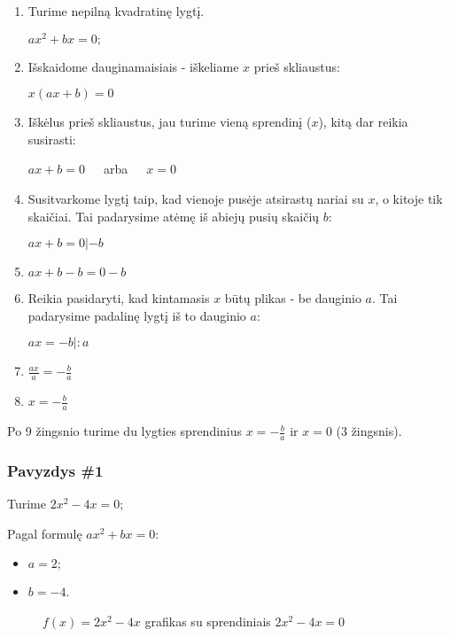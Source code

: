 \documentclass[a4paper]{article}
\begin{document}
\begin{enumerate}
    \item Turime nepilną kvadratinę lygtį.

    $ ax^{2}+ bx = 0; $
    \item Išskaidome dauginamaisiais - iškeliame $ x $ prieš skliaustus:

    $ x(ax + b) = 0 $
    \item Iškėlus prieš skliaustus, jau turime vieną sprendinį ($ x $), kitą dar reikia susirasti:

    $ ax+b = 0 $ $\;\;\;$ arba $\;\;\;$ $ x=0 $ 
    \item Susitvarkome lygtį taip, kad vienoje pusėje atsirastų nariai su $ x $, o kitoje tik skaičiai. Tai padarysime atėmę iš abiejų pusių skaičių $ b $:

    $ ax+b = 0 | - b $
    \item  $ ax+b-b = 0-b $
    \item Reikia pasidaryti, kad kintamasis $ x $ būtų plikas - be dauginio $ a $. Tai padarysime padalinę lygtį iš to dauginio $ a $:

    $ ax = -b | : a $
    \item $ \frac{ax}{a} = -\frac{b}{a} $
    \item $ x = -\frac{b}{a} $
\end{enumerate}
Po 9 žingsnio turime du lygties sprendinius $ x = -\frac{b}{a} $ ir $ x=0 $ (3 žingsnis).


\subsubsection{Pavyzdys \#1}

Turime $ 2x^{2}-4x = 0; $

Pagal formulę $ ax^{2}+ bx = 0 $:

\begin{itemize}
    \item $ a = 2; $
    \item $ b = -4 $.
\end{itemize}

\begin{figure}[!htbp]
    \begin{center}
    \end{center}
    \caption{$f(x)=2x^2-4x$ grafikas su sprendiniais $2x^2-4x=0$ }\label{exampleplot}
\end{figure}
\end{document}
